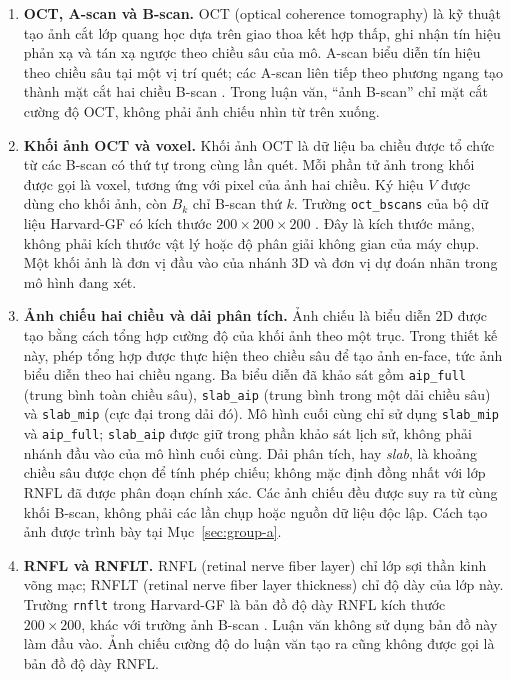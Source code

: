 \documentclass[14pt,a4paper,oneside]{extreport}
\begin{document}
\begin{enumerate}[label=\arabic*.,leftmargin=1cm]
  \item \textbf{OCT, A-scan và B-scan.}
  OCT (optical coherence tomography) là kỹ thuật tạo ảnh cắt lớp
  quang học dựa trên giao thoa kết hợp thấp, ghi nhận tín hiệu
  phản xạ và tán xạ ngược theo chiều sâu của mô. A-scan biểu diễn
  tín hiệu theo chiều sâu tại một vị trí quét; các A-scan liên
  tiếp theo phương ngang tạo thành mặt cắt hai chiều B-scan
  \cite{huang1991oct}. Trong luận văn, ``ảnh B-scan'' chỉ mặt cắt
  cường độ OCT, không phải ảnh chiếu nhìn từ trên xuống.

  \item \textbf{Khối ảnh OCT và voxel.}
  Khối ảnh OCT là dữ liệu ba chiều được tổ chức từ các B-scan có
  thứ tự trong cùng lần quét. Mỗi phần tử ảnh trong khối được gọi
  là voxel, tương ứng với pixel của ảnh hai chiều. Ký hiệu $V$
  được dùng cho khối ảnh, còn $B_k$ chỉ B-scan thứ $k$. Trường
  \texttt{oct\_bscans} của bộ dữ liệu Harvard-GF có kích thước
  $200\times200\times200$ \cite{harvardgfRepo}. Đây là kích thước
  mảng, không phải kích thước vật lý hoặc độ phân giải không gian
  của máy chụp. Một khối ảnh là đơn vị đầu vào của nhánh 3D và đơn
  vị dự đoán nhãn trong mô hình đang xét.

  \item \textbf{Ảnh chiếu hai chiều và dải phân tích.}
  Ảnh chiếu là biểu diễn 2D được tạo bằng cách tổng hợp cường độ
  của khối ảnh theo một trục. Trong thiết kế này, phép tổng hợp
  được thực hiện theo chiều sâu để tạo ảnh en-face, tức ảnh biểu
  diễn theo hai chiều ngang. Ba biểu diễn đã khảo sát gồm \texttt{aip\_full}
  (trung bình toàn chiều sâu), \texttt{slab\_aip} (trung bình trong
  một dải chiều sâu) và \texttt{slab\_mip} (cực đại trong dải đó).
  Mô hình cuối cùng chỉ sử dụng \texttt{slab\_mip} và \texttt{aip\_full};
  \texttt{slab\_aip} được giữ trong phần khảo sát lịch sử, không phải
  nhánh đầu vào của mô hình cuối cùng.
  Dải phân tích, hay \textit{slab}, là khoảng chiều sâu được chọn
  để tính phép chiếu; không mặc định đồng nhất với lớp RNFL đã
  được phân đoạn chính xác. Các ảnh chiếu đều được suy ra từ cùng
  khối B-scan, không phải các lần chụp hoặc nguồn dữ liệu độc lập.
  Cách tạo ảnh được trình bày tại Mục~\ref{sec:group-a}.

  \item \textbf{RNFL và RNFLT.}
  RNFL (retinal nerve fiber layer) chỉ lớp sợi thần kinh võng mạc;
  RNFLT (retinal nerve fiber layer thickness) chỉ độ dày của lớp
  này. Trường \texttt{rnflt} trong Harvard-GF là bản đồ độ dày
  RNFL kích thước $200\times200$, khác với trường ảnh B-scan
  \cite{harvardgfRepo}. Luận văn không sử dụng bản đồ này làm đầu
  vào. Ảnh chiếu cường độ do luận văn tạo ra cũng không được gọi
  là bản đồ độ dày RNFL.


\end{enumerate}
\end{document}
